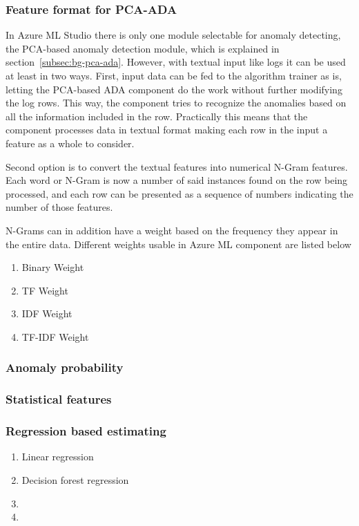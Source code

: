 \subsubsection*{Feature format for PCA-ADA}
In Azure ML Studio
there is only one module selectable
for anomaly detecting,
the PCA-based anomaly detection module,
which is explained in section~\ref{subsec:bg-pca-ada}.
However,
with textual input like logs
it can be used at least in two ways.
First,
input data can be fed to
the algorithm trainer as is,
letting the PCA-based ADA component
do the work without further modifying the log rows.
This way,
the component tries to recognize the anomalies
based on all the information included in the row.
Practically this means
that the component processes data in textual format
making each row in the input
a feature as a whole
to consider.

Second option is to
convert the textual features
into numerical N-Gram features.
Each word or N-Gram %
is now a number of said instances found on
the row being processed,
and each row can be presented
as a sequence of numbers
indicating the number of those features.

N-Grams can in addition have a weight
based on the frequency they appear
in the entire data.
Different weights usable in Azure ML component
are listed below

\begin{enumerate}
    \item Binary Weight
    \item TF Weight
    \item IDF Weight
    \item TF-IDF Weight
\end{enumerate}


\subsubsection*{Anomaly probability}

\subsubsection*{Statistical features}


\subsubsection*{Regression based estimating}

\begin{enumerate}
    \item Linear regression
    \item Decision forest regression
    \item \etc
    \item \etc
\end{enumerate}


\clearpage